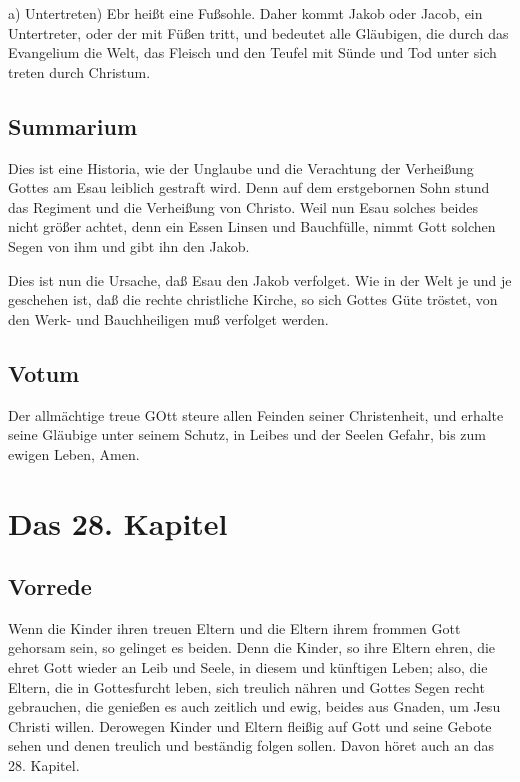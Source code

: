 a) Untertreten) Ebr heißt eine Fußsohle. Daher kommt Jakob oder Jacob, ein Untertreter, oder der mit Füßen tritt, und bedeutet alle Gläubigen, die durch das Evangelium die Welt, das Fleisch und den Teufel mit Sünde und Tod unter sich treten durch Christum.

\section{Summarium}

Dies ist eine Historia, wie der Unglaube und die Verachtung der Verheißung Gottes am Esau leiblich gestraft wird. Denn auf dem erstgebornen Sohn stund das Regiment und die Verheißung von Christo. Weil nun Esau solches beides nicht größer achtet, denn ein Essen Linsen und Bauchfülle, nimmt Gott solchen Segen von ihm und gibt ihn den Jakob.

Dies ist nun die Ursache, daß Esau den Jakob verfolget. Wie in der Welt je und je geschehen ist, daß die rechte christliche Kirche, so sich Gottes Güte tröstet, von den Werk- und Bauchheiligen muß verfolget werden.

\section{Votum}

Der allmächtige treue GOtt steure allen Feinden seiner Christenheit, und erhalte seine Gläubige unter seinem Schutz, in Leibes und der Seelen Gefahr, bis zum ewigen Leben, Amen.

\chapter{Das 28. Kapitel}

\section{Vorrede}

Wenn die Kinder ihren treuen Eltern und die Eltern ihrem frommen Gott gehorsam sein, so gelinget es beiden. Denn die Kinder, so ihre Eltern ehren, die ehret Gott wieder an Leib und Seele, in diesem und künftigen Leben; also, die Eltern, die in Gottesfurcht leben, sich treulich nähren und Gottes Segen recht gebrauchen, die genießen es auch zeitlich und ewig, beides aus Gnaden, um Jesu Christi willen. Derowegen Kinder und Eltern fleißig auf Gott und seine Gebote sehen und denen treulich und beständig folgen sollen. Davon höret auch an das 28. Kapitel.

